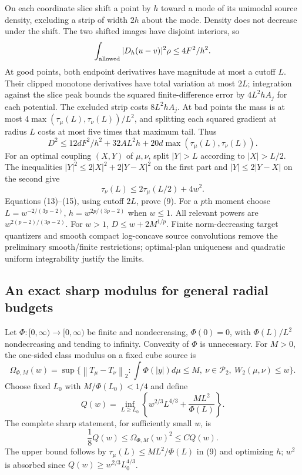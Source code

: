 \documentclass[11pt]{article}
\newcommand{\norm}[1]{\left\lVert#1\right\rVert}
\begin{document}
On each coordinate slice shift a point by $h$ toward a mode of its unimodal source density, excluding a strip of width $2h$ about the mode. Density does not decrease under the shift. The two shifted images have disjoint interiors, so
\[
\int_{\rm allowed}|D_h(u-v)|^2\rho\le4F^2/h^2.
\]
At good points, both endpoint derivatives have magnitude at most a cutoff $L$. Their clipped monotone derivatives have total variation at most $2L$; integration against the slice peak bounds the squared finite-difference error by $4L^2hA_j$ for each potential. The excluded strip costs $8L^2hA_j$. At bad points the mass is at most $4\max(\tau_\mu(L),\tau_\nu(L))/L^2$, and splitting each squared gradient at radius $L$ costs at most five times that maximum tail. Thus
\[
D^2\le12dF^2/h^2+32AL^2h
+20d\max(\tau_\mu(L),\tau_\nu(L)).\tag{14}
\]
For an optimal coupling $(X,Y)$ of $\mu,\nu$, split $|Y|>L$ according to $|X|>L/2$. The inequalities $|Y|^2\le2|X|^2+2|Y-X|^2$ on the first part and $|Y|\le2|Y-X|$ on the second give
\[
\tau_\nu(L)\le2\tau_\mu(L/2)+4w^2.\tag{15}
\]
Equations (13)--(15), using cutoff $2L$, prove (9). For a $p$th moment choose
$L=w^{-2/(3p-2)}$, $h=w^{2p/(3p-2)}$ when $w\le1$. All relevant powers are $w^{2(p-2)/(3p-2)}$. For $w>1$, $D\le w+2M^{1/p}$. Finite norm-decreasing target quantizers and smooth compact log-concave source convolutions remove the preliminary smooth/finite restrictions; optimal-plan uniqueness and quadratic uniform integrability justify the limits.

\subsection{An exact sharp modulus for general radial budgets}

Let $\Phi:[0,\infty)\to[0,\infty)$ be finite and nondecreasing, $\Phi(0)=0$, with $\Phi(L)/L^2$ nondecreasing and tending to infinity. Convexity of $\Phi$ is unnecessary. For $M>0$, the one-sided class modulus on a fixed cube source is
\[
\Omega_{\Phi,M}(w)=\sup\{\norm{T_\mu-T_\nu}_2:
\int\Phi(|y|)d\mu\le M,\ \nu\in\mathcal P_2,\ W_2(\mu,\nu)\le w\}.
\]
Choose fixed $L_0$ with $M/\Phi(L_0)<1/4$ and define
\[
Q(w)=\inf_{L\ge L_0}\left\{w^{2/3}L^{4/3}+\frac{ML^2}{\Phi(L)}\right\}.
\]
The complete sharp statement, for sufficiently small $w$, is
\[
\frac18Q(w)\le\Omega_{\Phi,M}(w)^2\le C Q(w).\tag{16}
\]
The upper bound follows by $\tau_\mu(L)\le ML^2/\Phi(L)$ in (9) and optimizing $h$; $w^2$ is absorbed since $Q(w)\ge w^{2/3}L_0^{4/3}$.
\end{document}
